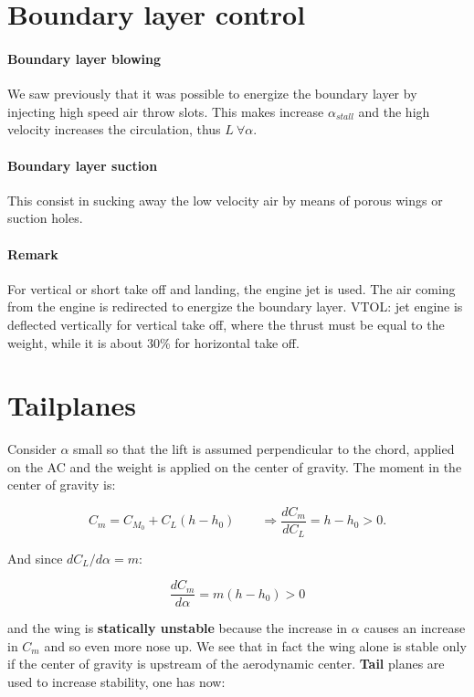 \section{Boundary layer control}	
\paragraph{Boundary layer blowing}
	We saw previously that it was possible to energize the boundary layer by injecting high speed air throw slots. This makes increase $\alpha _{stall}$ and the high velocity increases the circulation, thus $L \ \forall \alpha$. 
	
\paragraph{Boundary layer suction}
	This consist in sucking away the low velocity air by means of porous wings or suction holes. 
	
\paragraph{Remark}
	For vertical or short take off and landing, the engine jet is used. The air coming from the engine is redirected to energize the boundary layer. VTOL: jet engine is deflected vertically for vertical take off, where the thrust must be equal to the weight, while it is about 30\% for horizontal take off. 
	
\section{Tailplanes}
	Consider $\alpha$ small so that the lift is assumed perpendicular to the chord, applied on the AC and the weight is applied on the center of gravity. The moment in the center of gravity is:
	
	\begin{equation}
	C_m = C_{M_0} + C_L (h-h_0) \qquad \Rightarrow \frac{dC_m}{dC_L} = h -h_0 > 0.
\end{equation}	 

	And since $dC_L/d\alpha = m$:
	
	\begin{equation}
	\frac{dC_m}{d\alpha} = m(h-h_0)>0
	\end{equation}
	
	and the wing is \textbf{statically unstable} because the increase in $\alpha$ causes an increase in $C_m$ and so even more nose up. We see that in fact the wing alone is stable only if the center of gravity is upstream of the aerodynamic center. 
	\textbf{Tail} planes are used to increase stability, one has now: 
	
